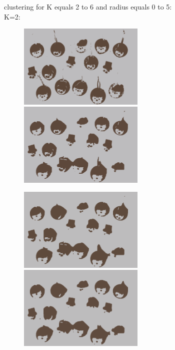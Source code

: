 clustering for K equals 2 to 6 and radius equals 0 to 5:\\
K=2:\\
\begin{center}
\begin{figure}[H]
\centering\includegraphics[width=6cm]{./imgkmeanscluster02-00.png}
\centering\includegraphics[width=6cm]{./imgkmeanscluster02-01.png}\\
\end{figure}
\end{center}
\begin{center}
\begin{figure}[H]
\centering\includegraphics[width=6cm]{./imgkmeanscluster02-02.png}
\centering\includegraphics[width=6cm]{./imgkmeanscluster02-03.png}\\
\end{figure}
\end{center}
